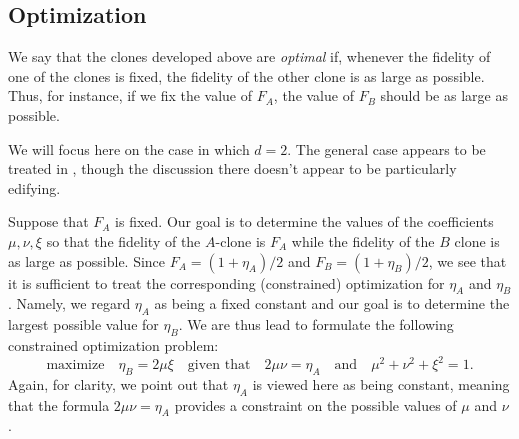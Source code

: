 \documentclass[reqno]{amsart}
\numberwithin{lemma}{section}
\numberwithin{proposition}{section}
\begin{document}
{\subsection{Optimization} \label{optimization}
We say that the clones developed above are \emph{optimal} if, whenever the fidelity of one of the clones is fixed, the fidelity of the other clone is as large as possible. Thus, for instance, if we fix the value of $F_{A}$, the value of $F_{B}$ should be as large as possible. 

We will focus here on the case in which $d=2$. The general case appears to be treated in \cite{lamoureux2004asymmetric}, though the discussion there doesn't appear to be particularly edifying. 

Suppose that $F_{A}$ is fixed. Our goal is to determine the values of the coefficients $\mu, \nu, \xi$ so that the fidelity of the $A$-clone is $F_{A}$ while the fidelity of the $B$ clone is as large as possible. Since $F_{A} = (1 + \eta_{A})/2$ and $F_{B} = (1 + \eta_{B})/2$, we see that it is sufficient to treat the corresponding (constrained) optimization for $\eta_{A}$ and $\eta_{B}$. Namely, we regard $\eta_{A}$ as being a fixed constant and our goal is to determine the largest possible value for $\eta_{B}$. We are thus lead to formulate the following constrained optimization problem:
\begin{equation}
\label{opt_prob}
\text{maximize} \quad \eta_{B} =  2\mu \xi \quad \text{given that} \quad  2 \mu \nu = \eta_{A} \quad \text{and} \quad \mu^{2} + \nu^{2} + \xi^{2} = 1.
\end{equation}
Again, for clarity, we point out that $\eta_{A}$ is viewed here as being constant, meaning that the formula $2\mu \nu = \eta_{A}$ provides a constraint on the possible values of $\mu$ and $\nu$.

}
\end{document}
